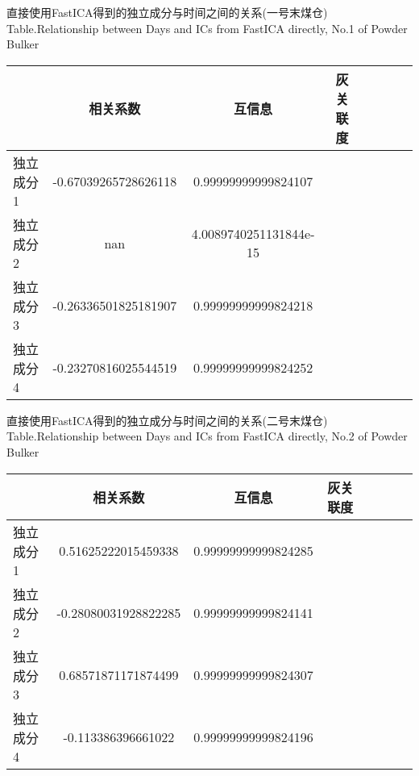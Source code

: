 \begin{table}[!h]
\begin{center}
		{直接使用FastICA得到的独立成分与时间之间的关系(一号末煤仓)}
			{Table.}{Relationship between Days and ICs from FastICA directly, No.1 of Powder Bulker}
\begin{tabular}{lccclccc}
\toprule
                		& 相关系数     					& 互信息      					&灰关联度 \\
\midrule
  独立成分1     	&  -0.67039265728626118     		& 0.99999999999824107   	&    \\
  独立成分2     	&  nan          						& 4.0089740251131844e-15   	&    \\
  独立成分3     	&  -0.26336501825181907      		& 0.99999999999824218   	&    \\
  独立成分4     	&  -0.23270816025544519      		& 0.99999999999824252  	&    \\
 \bottomrule
\end{tabular}
\end{center}
\end{table}

\begin{table}[!h]
\begin{center}
		{直接使用FastICA得到的独立成分与时间之间的关系(二号末煤仓)}
			{Table.}{Relationship between Days and ICs from FastICA directly, No.2 of Powder Bulker}
\begin{tabular}{lccclccc}
\toprule
                		& 相关系数     					& 互信息      					&灰关联度 \\
\midrule
  独立成分1     	&  0.51625222015459338     		& 0.99999999999824285   	&    \\
  独立成分2     	&  -0.28080031928822285		& 0.99999999999824141   	&    \\
  独立成分3     	&  0.68571871171874499      		& 0.99999999999824307   	&    \\
  独立成分4     	&  -0.113386396661022      		& 0.99999999999824196  	&    \\
 \bottomrule
\end{tabular}
\end{center}
\end{table}

